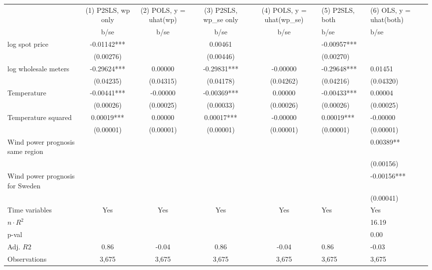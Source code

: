 \begin{tabular}{lcccc}\toprule
                    &(1) P2SLS, wp only   &(2) POLS, y = uhat(wp)   &(3) P2SLS, wp_se only   &(4) POLS, y = uhat(wp_se)   &(5) P2SLS, both   &(6) OLS, y = uhat(both)   \\
                    &        b/se   &        b/se   &        b/se   &        b/se   &        b/se   &        b/se   \\
\midrule
log spot price      &    -0.01142***&               &     0.00461   &               &    -0.00957***&               \\
                    &   (0.00276)   &               &   (0.00446)   &               &   (0.00270)   &               \\
log wholesale meters&    -0.29624***&     0.00000   &    -0.29831***&    -0.00000   &    -0.29648***&     0.01451   \\
                    &   (0.04235)   &   (0.04315)   &   (0.04178)   &   (0.04262)   &   (0.04216)   &   (0.04320)   \\
Temperature         &    -0.00441***&    -0.00000   &    -0.00369***&     0.00000   &    -0.00433***&     0.00004   \\
                    &   (0.00026)   &   (0.00025)   &   (0.00033)   &   (0.00026)   &   (0.00026)   &   (0.00025)   \\
Temperature squared &     0.00019***&     0.00000   &     0.00017***&    -0.00000   &     0.00019***&    -0.00000   \\
                    &   (0.00001)   &   (0.00001)   &   (0.00001)   &   (0.00001)   &   (0.00001)   &   (0.00001)   \\
Wind power prognosis same region&               &               &               &               &               &     0.00389** \\
                    &               &               &               &               &               &   (0.00156)   \\
Wind power prognosis for Sweden&               &               &               &               &               &    -0.00156***\\
                    &               &               &               &               &               &   (0.00041)   \\
Time variables      &         Yes   &         Yes   &         Yes   &         Yes   &         Yes   &         Yes   \\
\midrule
\(n\cdot R^2\)      &               &               &               &               &               &       16.19   \\
p-val               &               &               &               &               &               &        0.00   \\
Adj. \(R2\)         &        0.86   &       -0.04   &        0.86   &       -0.04   &        0.86   &       -0.03   \\
Observations        &       3,675   &       3,675   &       3,675   &       3,675   &       3,675   &       3,675   \\
\bottomrule\end{tabular}
